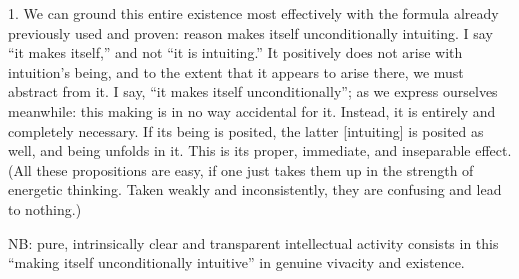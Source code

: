 1. We can ground this entire existence
most effectively with the formula
already previously used and proven:
reason makes itself unconditionally intuiting.
I say “it makes itself,” and not “it is intuiting.”
It positively does not arise with intuition’s being,
and to the extent that it appears to arise there,
we must abstract from it.
I say, “it makes itself unconditionally”;
as we express ourselves meanwhile:
this making is in no way accidental for it.
Instead, it is entirely and completely necessary.
If its being is posited, the latter [intuiting]
is posited as well, and being unfolds in it.
This is its proper, immediate, and inseparable effect.
(All these propositions are easy,
if one just takes them up
in the strength of energetic thinking.
Taken weakly and inconsistently,
they are confusing and lead to nothing.)

NB: pure, intrinsically clear and transparent
intellectual activity consists in this
“making itself unconditionally intuitive”
in genuine vivacity and existence.

